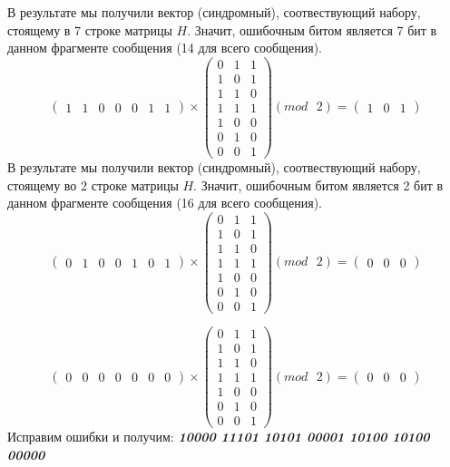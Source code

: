 \documentclass[a5paper, 10pt]{article}
\theoremstyle{definition}
\theoremstyle{plain}
\theoremstyle{remark}
\begin{document}
В результате мы получили вектор (синдромный), соотвествующий набору, стоящему в 7 строке матрицы $H$. Значит, ошибочным битом является 7 бит в данном фрагменте сообщения (14 для всего сообщения).\\
\begin{equation}
\begin{pmatrix}
1 & 1 & 0 & 0 & 0 & 1 & 1
\end{pmatrix}
 \times
\begin{pmatrix}
0 & 1 & 1\\
1 & 0 & 1\\
1 & 1 & 0\\
1 & 1 & 1 \\
1 & 0 & 0\\
0 & 1 & 0 \\
0 & 0 & 1
\end{pmatrix}
(mod \text{ }2)
= \begin{pmatrix}
1 & 0 & 1
\end{pmatrix}
\end{equation}
В результате мы получили вектор (синдромный), соотвествующий набору, стоящему во 2 строке матрицы $H$. Значит, ошибочным битом является 2 бит в данном фрагменте сообщения (16 для всего сообщения).\\
\begin{equation}
\begin{pmatrix}
0 & 1 & 0 & 0 & 1 & 0 & 1
\end{pmatrix}
 \times
\begin{pmatrix}
0 & 1 & 1\\
1 & 0 & 1\\
1 & 1 & 0\\
1 & 1 & 1 \\
1 & 0 & 0\\
0 & 1 & 0 \\
0 & 0 & 1
\end{pmatrix}
(mod \text{ }2)
= \begin{pmatrix}
0 & 0 & 0 
\end{pmatrix}
\end{equation}

\begin{equation}
\begin{pmatrix}
0 & 0 & 0 & 0 & 0 & 0 & 0
\end{pmatrix}
 \times
\begin{pmatrix}
0 & 1 & 1\\
1 & 0 & 1\\
1 & 1 & 0\\
1 & 1 & 1 \\
1 & 0 & 0\\
0 & 1 & 0 \\
0 & 0 & 1
\end{pmatrix}
(mod \text{ }2)
= \begin{pmatrix}
0 & 0 & 0 
\end{pmatrix}
\end{equation}
Исправим ошибки и получим:  \textbf{\textit{10000 11101 10101 00001 10100 10100 00000}}
\end{document}
